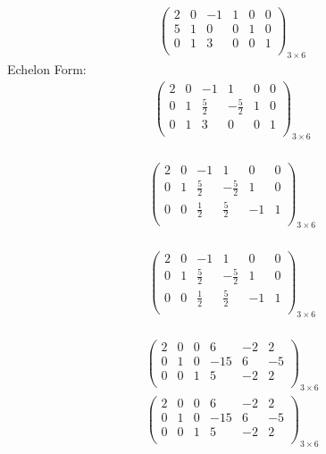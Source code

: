 \documentclass{article}
\begin{document}
\begin{align*}
\left(
\begin{array}{ccc|ccc}
2 & 0 & -1 & 1 & 0 & 0\\
5 & 1 & 0 & 0 & 1 & 0\\
0 & 1 & 3 & 0 & 0 & 1\\
\end{array}
\right)_{3\times 6}
\end{align*}
Echelon Form:\\
\begin{align*}
\left(
\begin{array}{ccc|ccc}
2 & 0 & -1 & 1 & 0 & 0\\
0 & 1 & \frac{5}{2} & -\frac{5}{2} & 1 & 0\\
0 & 1 & 3 & 0 & 0 & 1\\
\end{array}
\right)_{3\times 6}
\end{align*}
\\
\begin{align*}
\left(
\begin{array}{ccc|ccc}
2 & 0 & -1 & 1 & 0 & 0\\
0 & 1 & \frac{5}{2} & -\frac{5}{2} & 1 & 0\\
0 & 0 & \frac{1}{2} & \frac{5}{2} & -1 & 1\\
\end{array}
\right)_{3\times 6}
\end{align*}
\\
\begin{align*}
\left(
\begin{array}{ccc|ccc}
2 & 0 & -1 & 1 & 0 & 0\\
0 & 1 & \frac{5}{2} & -\frac{5}{2} & 1 & 0\\
0 & 0 & \frac{1}{2} & \frac{5}{2} & -1 & 1\\
\end{array}
\right)_{3\times 6}
\end{align*}
\\
\begin{align*}
\left(
\begin{array}{ccc|ccc}
2 & 0 & 0 & 6 & -2 & 2\\
0 & 1 & 0 & -15 & 6 & -5\\
0 & 0 & 1 & 5 & -2 & 2\\
\end{array}
\right)_{3\times 6}
\end{align*}
\begin{align*}
\left(
\begin{array}{ccc|ccc}
2 & 0 & 0 & 6 & -2 & 2\\
0 & 1 & 0 & -15 & 6 & -5\\
0 & 0 & 1 & 5 & -2 & 2\\
\end{array}
\right)_{3\times 6}
\end{align*}
\end{document}

